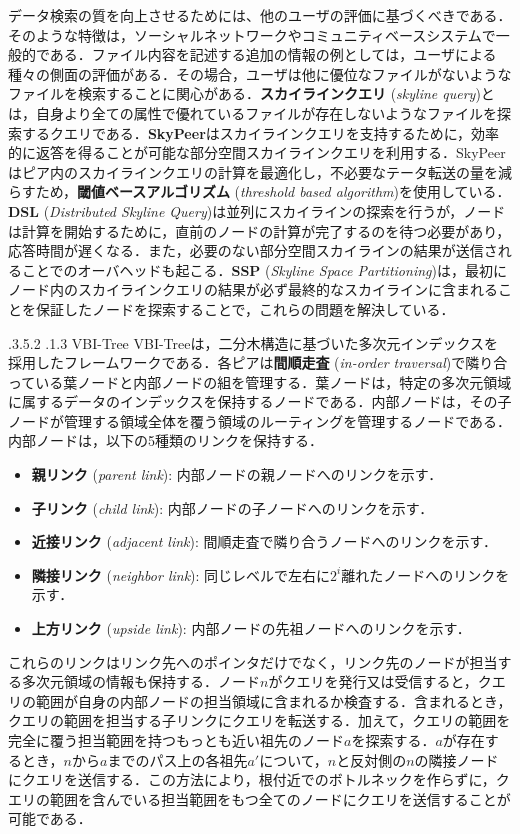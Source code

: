 \documentclass{jarticle}
\makeatletter
\renewcommand{\subsubsection}{\@startsection{subsubsection}{3}{\z@}%
   {.3\Cvs \@plus.5\Cvs \@minus.2\Cvs}%
   {.1\Cvs \@plus.3\Cvs}%
   {\reset@font\normalsize\bfseries}}
\makeatother
\begin{document}
{データ検索の質を向上させるためには、他のユーザの評価に基づくべきである．そのような特徴は，ソーシャルネットワークやコミュニティベースシステムで一般的である．ファイル内容を記述する追加の情報の例としては，ユーザによる種々の側面の評価がある．その場合，ユーザは他に優位なファイルがないようなファイルを検索することに関心がある．\textbf{スカイラインクエリ} (\textit{skyline query})とは，自身より全ての属性で優れているファイルが存在しないようなファイルを探索するクエリである．\textbf{SkyPeer}はスカイラインクエリを支持するために，効率的に返答を得ることが可能な部分空間スカイラインクエリを利用する．SkyPeerはピア内のスカイラインクエリの計算を最適化し，不必要なテータ転送の量を減らすため，\textbf{閾値ベースアルゴリズム} (\textit{threshold based algorithm})を使用している．\textbf{DSL} (\textit{Distributed Skyline Query})は並列にスカイラインの探索を行うが，ノードは計算を開始するために，直前のノードの計算が完了するのを待つ必要があり，応答時間が遅くなる．また，必要のない部分空間スカイラインの結果が送信されることでのオーバヘッドも起こる．\textbf{SSP} (\textit{Skyline Space Partitioning})は，最初にノード内のスカイラインクエリの結果が必ず最終的なスカイラインに含まれることを保証したノードを探索することで，これらの問題を解決している．


\subsubsection{VBI-Tree}
VBI-Treeは，二分木構造に基づいた多次元インデックスを採用したフレームワークである．各ピアは\textbf{間順走査} (\textit{in-order traversal})で隣り合っている葉ノードと内部ノードの組を管理する．葉ノードは，特定の多次元領域に属するデータのインデックスを保持するノードである．内部ノードは，その子ノードが管理する領域全体を覆う領域のルーティングを管理するノードである．内部ノードは，以下の5種類のリンクを保持する．
\begin{itemize}
  \item\textbf{親リンク} (\textit{parent link}): 内部ノードの親ノードへのリンクを示す．
  \item\textbf{子リンク} (\textit{child link}): 内部ノードの子ノードへのリンクを示す．
  \item\textbf{近接リンク} (\textit{adjacent link}): 間順走査で隣り合うノードへのリンクを示す．
  \item\textbf{隣接リンク} (\textit{neighbor link}): 同じレベルで左右に$2^i$離れたノードへのリンクを示す．
  \item\textbf{上方リンク} (\textit{upside link}): 内部ノードの先祖ノードへのリンクを示す．
\end{itemize}
これらのリンクはリンク先へのポインタだけでなく，リンク先のノードが担当する多次元領域の情報も保持する．ノード$n$がクエリを発行又は受信すると，クエリの範囲が自身の内部ノードの担当領域に含まれるか検査する．含まれるとき，クエリの範囲を担当する子リンクにクエリを転送する．加えて，クエリの範囲を完全に覆う担当範囲を持つもっとも近い祖先のノード$a$を探索する．$a$が存在するとき，$n$から$a$までのパス上の各祖先$a'$について，$n$と反対側の$n$の隣接ノードにクエリを送信する．この方法により，根付近でのボトルネックを作らずに，クエリの範囲を含んでいる担当範囲をもつ全てのノードにクエリを送信することが可能である．

}
\end{document}
